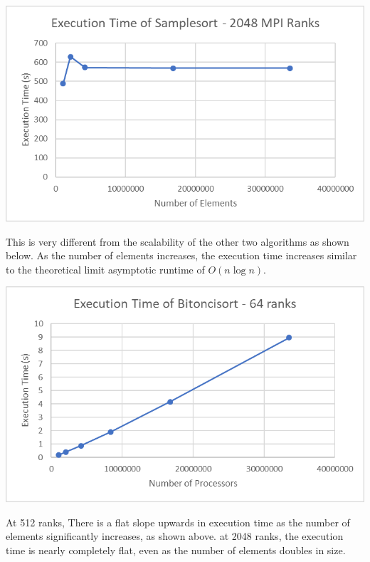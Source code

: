 \documentclass[10pt,letterpaper]{article}
\begin{document}
\begin{multicols}{2}
\begin{center}
\includegraphics[scale=1]{samplesort_2048}
\end{center}

This is very different from the scalability of the other two algorithms as shown below. As the number of elements increases, the execution time increases similar to the theoretical limit asymptotic runtime of $O(n \log n)$.

\begin{center}
\includegraphics[scale=1]{bitonicsort_64}
\end{center}

At 512 ranks, There is a flat slope upwards in execution time as the number of elements significantly increases, as shown above. at 2048 ranks, the execution time is nearly completely flat, even as the number of elements doubles in size.


\end{multicols}
\end{document}
